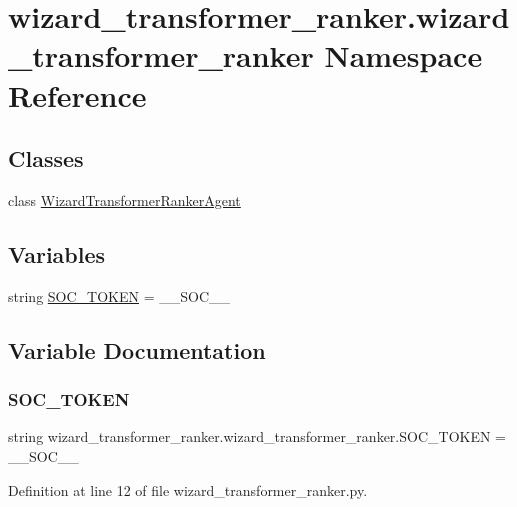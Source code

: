 \hypertarget{namespacewizard__transformer__ranker_1_1wizard__transformer__ranker}{}\section{wizard\+\_\+transformer\+\_\+ranker.\+wizard\+\_\+transformer\+\_\+ranker Namespace Reference}
\label{namespacewizard__transformer__ranker_1_1wizard__transformer__ranker}
\subsection*{Classes}
\begin{DoxyCompactItemize}
\item 
class \hyperlink{classwizard__transformer__ranker_1_1wizard__transformer__ranker_1_1WizardTransformerRankerAgent}{Wizard\+Transformer\+Ranker\+Agent}
\end{DoxyCompactItemize}
\subsection*{Variables}
\begin{DoxyCompactItemize}
\item 
string \hyperlink{namespacewizard__transformer__ranker_1_1wizard__transformer__ranker_aade8656619ff0382aff6fdb44ac6f1ad}{S\+O\+C\+\_\+\+T\+O\+K\+EN} = \textquotesingle{}\+\_\+\+\_\+\+S\+O\+C\+\_\+\+\_\+\textquotesingle{}
\end{DoxyCompactItemize}


\subsection{Variable Documentation}
\mbox{\label{namespacewizard__transformer__ranker_1_1wizard__transformer__ranker_aade8656619ff0382aff6fdb44ac6f1ad}} 
\subsubsection{\texorpdfstring{S\+O\+C\+\_\+\+T\+O\+K\+EN}{SOC\_TOKEN}}
{\footnotesize\ttfamily string wizard\+\_\+transformer\+\_\+ranker.\+wizard\+\_\+transformer\+\_\+ranker.\+S\+O\+C\+\_\+\+T\+O\+K\+EN = \textquotesingle{}\+\_\+\+\_\+\+S\+O\+C\+\_\+\+\_\+\textquotesingle{}}



Definition at line 12 of file wizard\+\_\+transformer\+\_\+ranker.\+py.


